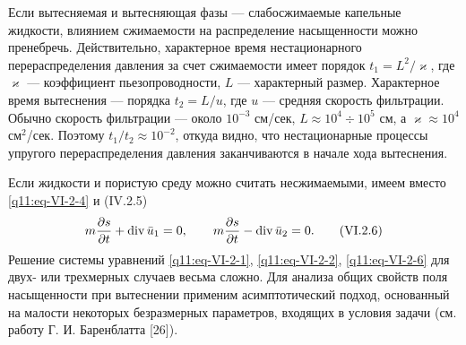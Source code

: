 Если вытесняемая и вытесняющая фазы --- слабосжимаемые капельные жидкости, влиянием сжимаемости на распределение насыщенности можно пренебречь. Действительно, характерное время нестационарного перераспределения давления за счет сжимаемости имеет порядок $t_1=L^2/\varkappa$, где $\varkappa$ --- коэффициент пьезопроводности, $L$ --- характерный размер. Характерное время вытеснения --- порядка $t_2=L/u$, где $u$ --- средняя скорость фильтрации. Обычно скорость фильтрации --- около $10^{-3}$ см/сек, $L\approx10^4\div10^5$ см, а $\varkappa\approx10^4$ см$^2$/сек. Поэтому $t_1/t_2\approx10^{-2}$, откуда видно, что нестационарные процессы упругого перераспределения давления заканчиваются в начале хода вытеснения.

Если жидкости и пористую среду можно считать несжимаемыми, имеем вместо \eqref{q11:eq-VI-2-4} и (IV.2.5)
\begin{equation}m\frac{\partial s}{\partial t}+\operatorname{div}\bar u_1=0,\qquad m\frac{\partial s}{\partial t}-\operatorname{div}\bar u_2=0.\tag{VI.2.6}\label{q11:eq-VI-2-6}\end{equation}
Решение системы уравнений \eqref{q11:eq-VI-2-1}, \eqref{q11:eq-VI-2-2}, \eqref{q11:eq-VI-2-6} для двух- или трехмерных случаев весьма сложно. Для анализа общих свойств поля насыщенности при вытеснении применим асимптотический подход, основанный на малости некоторых безразмерных параметров, входящих в условия задачи (см. работу Г. И. Баренблатта [26]).

